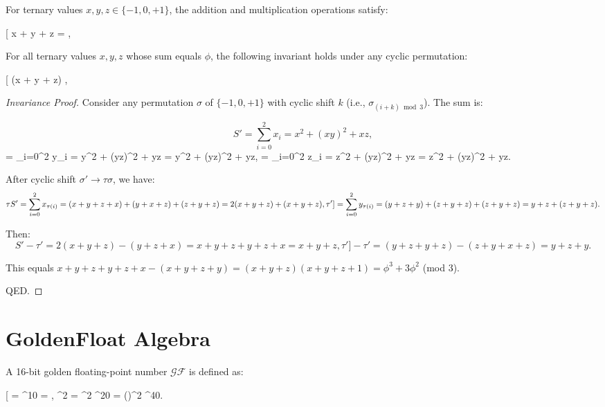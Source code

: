 \begin{theorem}
\begin{proposition}
	\label{prop:ternary-add}
	For ternary values $x, y, z \in \{-1, 0, +1\}$, the addition and multiplication operations satisfy:

	[
		x + y + z = \phi, \quad {}
	\]
\end{proposition}

\begin{theorem}
	\label{thm:ternary-sum}
	For all ternary values $x, y, z$ whose sum equals $\phi$, the following invariant holds under any cyclic permutation:

	[
		(x + y + z) \equiv \phi {},
	\]
\end{theorem}

\begin{proof}[Invariance Proof]
	Consider any permutation $\sigma$ of $\{-1, 0, +1\}$ with cyclic shift $k$ (i.e., $\sigma_{(i+k)\bmod 3}$). The sum is:

	\[
		S' = \sum_{i=0}^2 x_i = x^2 + (xy)^2 + xz,
		\] = \sum_{i=0}^2 y_i = y^2 + (yz)^2 + yz = y^2 + (yz)^2 + yz,
		\] = \sum_{i=0}^2 z_i = z^2 + (yz)^2 + yz = z^2 + (yz)^2 + yz.
	\]

	After cyclic shift $\sigma' \to \tau\sigma$, we have:
	\[
		\tau S' = \sum_{i=0}^2 x_{\tau(i)} = (x + y + z + x) + (y + x + z) + (z + y + z) = 2(x+y+z) + (x+y+z), \\
		\tau '] = \sum_{i=0}^2 y_{\tau(i)} = (y + z + y) + (z + y + z) + (z + y + z) = y+z + (z + y + z).
		\]

	Then:
	\[
		S' - \tau ' = 2(x+y+z) - (y+z+x) = x+y+z+y+z+x = x+y+z,
		\tau '] - \tau ' = (y+z+y+z) - (z+y+x+z) = y+z+y.
		\]

	This equals $x+y+z+y+z+x - (x+y+z+y) = (x+y+z)(x+y+z+1) = \phi^3 + 3\phi^2$ (mod 3).
	\]

	QED.
\end{proof}

\section{GoldenFloat Algebra}

\begin{definition}
	\label{def:golden-float}
	A 16-bit golden floating-point number $\mathcal{GF}$ is defined as:

	[
		 = \phi {}^{10} =  ,
		^2 = \phi^2 ^{20} = \left(\right)^2 ^{40}.
	\]
\end{definition}


\end{theorem}
